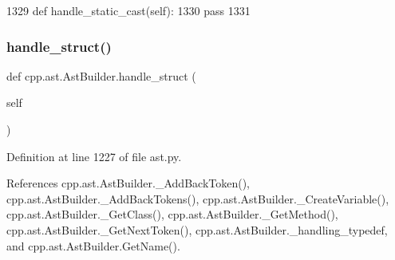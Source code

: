 \begin{DoxyCode}
1329     \textcolor{keyword}{def }handle\_static\_cast(self):
1330         \textcolor{keywordflow}{pass}
1331 
\end{DoxyCode}
\mbox{\label{classcpp_1_1ast_1_1AstBuilder_aadfad5b8d50962c04504e806dc0f5b6c}} 
\subsubsection{\texorpdfstring{handle\+\_\+struct()}{handle\_struct()}}
{\footnotesize\ttfamily def cpp.\+ast.\+Ast\+Builder.\+handle\+\_\+struct (\begin{DoxyParamCaption}\item[{}]{self }\end{DoxyParamCaption})}



Definition at line 1227 of file ast.\+py.



References cpp.\+ast.\+Ast\+Builder.\+\_\+\+Add\+Back\+Token(), cpp.\+ast.\+Ast\+Builder.\+\_\+\+Add\+Back\+Tokens(), cpp.\+ast.\+Ast\+Builder.\+\_\+\+Create\+Variable(), cpp.\+ast.\+Ast\+Builder.\+\_\+\+Get\+Class(), cpp.\+ast.\+Ast\+Builder.\+\_\+\+Get\+Method(), cpp.\+ast.\+Ast\+Builder.\+\_\+\+Get\+Next\+Token(), cpp.\+ast.\+Ast\+Builder.\+\_\+handling\+\_\+typedef, and cpp.\+ast.\+Ast\+Builder.\+Get\+Name().


